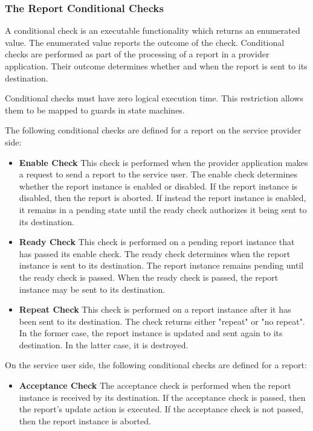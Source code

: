 \subsubsection{The Report Conditional Checks}\label{sec:RepConditionalChecks}

A conditional check is an executable functionality which returns an enumerated value. The enumerated value reports the outcome of the check. Conditional checks are performed as part of the processing of a report in a provider application. Their outcome determines whether and when the report is sent to its destination. 

Conditional checks must have zero logical execution time. This restriction allows them to be mapped to guards in state machines. 

The following conditional checks are defined for a report on the service provider side:

\begin{itemize}
\item \textbf{Enable Check}
This check is performed when the provider application makes a request to send a report to the service user. The enable check determines whether the report instance is enabled or disabled. If the report instance is disabled, then the report is aborted. If instead the report instance is enabled, it remains in a pending state until the ready check authorizes it being sent to its destination.

\item \textbf{Ready Check}
This check is performed on a pending report instance that has passed its enable check. The ready check determines when the report instance is sent to its destination.  The report instance remains pending until the ready check is passed. When the ready check is passed, the report instance may be sent to its destination.  

\item \textbf{Repeat Check}
This check is performed on a report instance after it has been sent to its destination. The check returns either "repeat" or "no repeat". In the former case, the report instance is updated and sent again to its destination. In the latter case, it is destroyed.
\end{itemize}

On the service user side, the following conditional checks are defined for a report:

\begin{itemize}
\item \textbf{Acceptance Check}
The acceptance check is performed when the report instance is received by its destination. If the acceptance check is passed, then the report's update action is executed. If the acceptance check is not passed, then the report instance is aborted.
\end{itemize}

